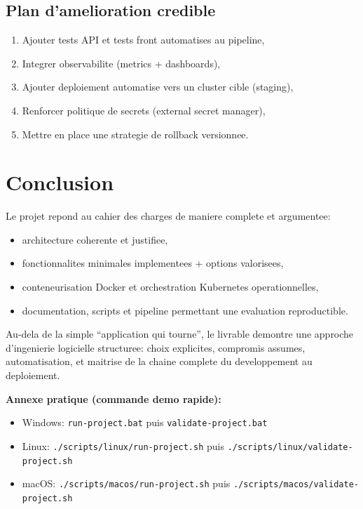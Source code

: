 \documentclass[11pt,a4paper]{article}
\begin{document}
\subsection{Plan d'amelioration credible}
\begin{enumerate}
  \item Ajouter tests API et tests front automatises au pipeline,
  \item Integrer observabilite (metrics + dashboards),
  \item Ajouter deploiement automatise vers un cluster cible (staging),
  \item Renforcer politique de secrets (external secret manager),
  \item Mettre en place une strategie de rollback versionnee.
\end{enumerate}

\section{Conclusion}

Le projet repond au cahier des charges de maniere complete et argumentee:
\begin{itemize}
  \item architecture coherente et justifiee,
  \item fonctionnalites minimales implementees + options valorisees,
  \item conteneurisation Docker et orchestration Kubernetes operationnelles,
  \item documentation, scripts et pipeline permettant une evaluation reproductible.
\end{itemize}

Au-dela de la simple ``application qui tourne'', le livrable demontre une approche d'ingenierie logicielle
structuree: choix explicites, compromis assumes, automatisation, et maitrise de la chaine complete du developpement au deploiement.

\vspace{0.5cm}
\noindent\textbf{Annexe pratique (commande demo rapide):}
\begin{itemize}
  \item Windows: \texttt{run-project.bat} puis \texttt{validate-project.bat}
  \item Linux: \texttt{./scripts/linux/run-project.sh} puis \texttt{./scripts/linux/validate-project.sh}
  \item macOS: \texttt{./scripts/macos/run-project.sh} puis \texttt{./scripts/macos/validate-project.sh}
\end{itemize}
\end{document}
